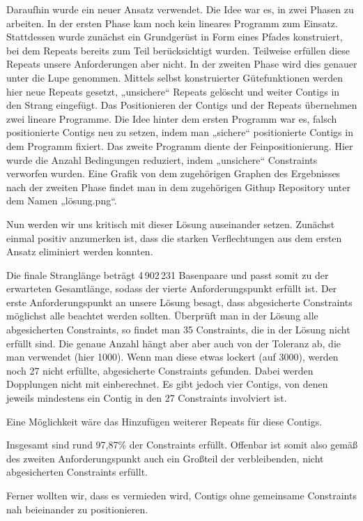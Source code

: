 Daraufhin wurde ein neuer Ansatz verwendet. Die Idee war es, in zwei Phasen zu arbeiten.
In der ersten Phase kam noch kein lineares Programm zum Einsatz. 
Stattdessen wurde zunächst ein Grundgerüst in Form eines Pfades konstruiert, bei dem Repeats bereits zum Teil berücksichtigt wurden.
Teilweise erfüllen diese Repeats unsere Anforderungen aber nicht.
In der zweiten Phase wird dies genauer unter die Lupe genommen. 
Mittels selbst konstruierter Gütefunktionen werden hier neue Repeats gesetzt, „unsichere“ Repeats gelöscht und weiter Contigs in den Strang eingefügt.
Das Positionieren der Contigs und der Repeats übernehmen zwei lineare Programme. 
Die Idee hinter dem ersten Programm war es, falsch positionierte Contigs neu zu setzen, indem man „sichere“ positionierte Contigs in dem Programm fixiert.
Das zweite Programm diente der Feinpositionierung. Hier wurde die Anzahl Bedingungen reduziert, indem „unsichere“ Constraints verworfen wurden. 
Eine Grafik von dem zugehörigen Graphen des Ergebnisses nach der zweiten Phase findet man in dem zugehörigen Githup Repository unter dem Namen „lösung.png“.


Nun werden wir uns kritisch mit dieser Lösung auseinander setzen. Zunächst einmal positiv anzumerken ist, dass die starken Verflechtungen aus dem ersten Ansatz eliminiert werden konnten.

Die finale Stranglänge beträgt 4\,902\,231 Basenpaare und passt somit zu der erwarteten Gesamtlänge, sodass der vierte Anforderungspunkt erfüllt ist. Der erste Anforderungspunkt an unsere Lösung besagt, dass abgesicherte Constraints möglichst alle beachtet werden sollten.
Überprüft man in der Lösung alle abgesicherten Constraints, so findet man 35 Constraints, die in der Lösung nicht erfüllt sind. Die genaue Anzahl hängt aber aber auch von der Toleranz ab, die man verwendet (hier 1000). 
Wenn man diese etwas lockert (auf 3000), werden noch 27 nicht erfüllte, abgesicherte Constraints gefunden. Dabei werden Dopplungen nicht mit einberechnet.
Es gibt jedoch vier Contigs, von denen jeweils mindestens ein Contig in den 27 Constraints involviert ist.

Eine Möglichkeit wäre das Hinzufügen weiterer Repeats für diese Contigs.

Insgesamt sind rund 97,87\% der Constraints erfüllt. Offenbar ist somit also gemäß des zweiten Anforderungspunkt auch ein Großteil der verbleibenden, nicht abgesicherten Constraints erfüllt.

Ferner wollten wir, dass es vermieden wird, Contigs ohne gemeinsame Constraints nah beieinander zu positionieren.

